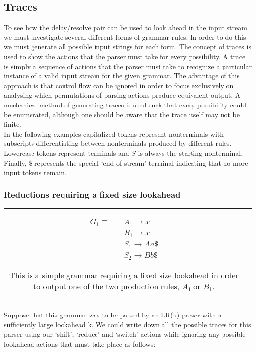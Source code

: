 \documentclass[11pt]{article}
\begin{document}
\subsection{Traces}
To see how the delay/resolve pair can be used to look ahead in the input stream we must investigate several different forms of grammar rules.
In order to do this we must generate all possible input strings for each form. 
The concept of traces is used to show the actions that the parser must take for every possibility. 
A trace is simply a sequence of actions that the parser must take to recognize a particular instance of a valid input stream for the given grammar.
The advantage of this approach is that control flow can be ignored in order to focus exclusively on analysing which permutations of parsing actions produce equivalent output.
A mechanical method of generating traces is used such that every possibility could be enumerated, although one should be aware that the trace itself may not be finite.\\

In the following examples capitalized tokens represent nonterminals with subscripts differentiating between nonterminals produced by different rules. 
Lowercase tokens represent terminals and $S$ is always the starting nonterminal. 
Finally, $\$$ represents the special `end-of-stream' terminal indicating that no more input tokens remain.\\

\subsubsection{Reductions requiring a fixed size lookahead}
\begin{tabular}[t]{cl}
\parbox{.3\textwidth}{
\begin{align*}
G_1 \equiv \quad & A_1 \rightarrow x\\
                 & B_1 \rightarrow x\\
                 & S_1 \rightarrow A a \$\\
                 & S_2 \rightarrow B b \$
\end{align*}}
\parbox{.8\textwidth}{This is a simple grammar requiring a fixed size lookahead in order to output one of the two production rules, $A_1$ or $B_1$.}
\end{tabular}

Suppose that this grammar was to be parsed by an LR(k) parser with a sufficiently large lookahead k. 
We could write down all the possible traces for this parser using our `shift', `reduce' and `switch' actions while ignoring any possible lookahead actions that must take place as follows:
\end{document}
